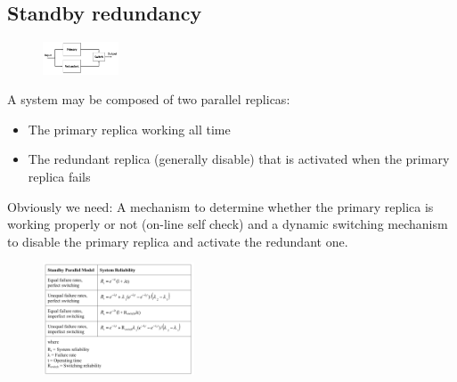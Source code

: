 \documentclass[10pt, oneside]{article}
\begin{document}
\subsection{Standby redundancy}
\begin{multicols}{2}
    \begin{figure}[H]
        \begin{center}
        \includegraphics[width=0.2\textwidth]{img/img89.png}
        \end{center}
    \end{figure}
    A system may be composed of two parallel replicas:\begin{itemize}
        \item The primary replica working all time
        \item The redundant replica (generally disable) that is activated when the primary replica fails
    \end{itemize}
    Obviously we need: A mechanism to determine whether the primary replica is working properly or not (on-line self check) and a dynamic switching mechanism to disable the primary replica and activate the redundant one.
    \columnbreak
    \begin{figure}[H]
        \begin{center}
        \includegraphics[width=0.4\textwidth]{img/img90.png}
        \end{center}
    \end{figure}
\end{multicols}
\end{document}
